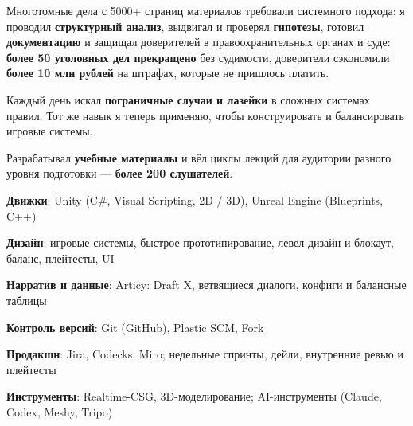 \documentclass[10pt]{article}
\begin{document}
\begin{points}
  \item Многотомные дела с 5000+ страниц материалов требовали системного подхода: я проводил \textbf{структурный анализ},
        выдвигал и проверял \textbf{гипотезы}, готовил \textbf{документацию} и защищал доверителей в правоохранительных
        органах и суде: \textbf{более 50 уголовных дел прекращено} без судимости, доверители сэкономили \textbf{более 10 млн рублей} на штрафах, которые не пришлось платить.
  \item Каждый день искал \textbf{пограничные случаи и лазейки} в сложных системах правил. Тот же навык я теперь
        применяю, чтобы конструировать и балансировать игровые системы.
\end{points}
\begin{points}
  \item Разрабатывал \textbf{учебные материалы} и вёл циклы лекций для аудитории разного уровня подготовки --- \textbf{более 200 слушателей}.
\end{points}

\newpage
{}
\par
{}
\par

\begin{plainlist}
  \item \textbf{Движки}: Unity (C\#, Visual Scripting, 2D / 3D), Unreal Engine (Blueprints, C++)
  \item \textbf{Дизайн}: игровые системы, быстрое прототипирование, левел-дизайн и блокаут, баланс, плейтесты, UI
  \item \textbf{Нарратив и данные}: Articy: Draft X, ветвящиеся диалоги, конфиги и балансные таблицы
  \item \textbf{Контроль версий}: Git (GitHub), Plastic SCM, Fork
  \item \textbf{Продакшн}: Jira, Codecks, Miro; недельные спринты, дейли, внутренние ревью и плейтесты
  \item \textbf{Инструменты}: Realtime-CSG, 3D-моделирование; AI-инструменты (Claude, Codex, Meshy, Tripo)
\end{plainlist}
\end{document}
